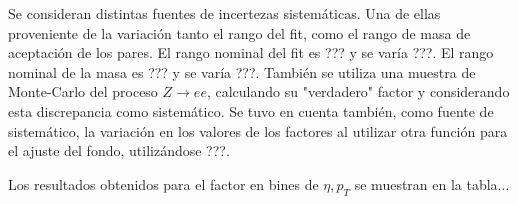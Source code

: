Se consideran distintas fuentes de incertezas sistemáticas. Una de ellas proveniente de la variación tanto el rango del fit, como el rango de masa de aceptación de los pares. El rango nominal del fit es ??? y se varía ???. El rango nominal de la masa es ??? y se varía ???. También se utiliza una muestra de Monte-Carlo del proceso $Z\rightarrow ee$, calculando su "verdadero" factor y considerando esta discrepancia como sistemático. Se tuvo en cuenta también, como fuente de sistemático, la variación en los valores de los factores al utilizar otra función para el ajuste del fondo, utilizándose ???.

Los resultados obtenidos para el factor en bines de $\eta , p_{T}$ se muestran en la tabla...